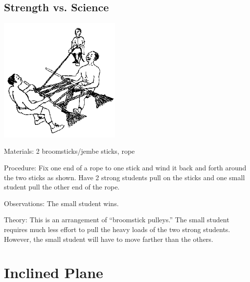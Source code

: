 \begin{multicols}{2}
\vfill
\columnbreak

\subsection{Strength vs. Science}

\begin{center}
\includegraphics[width=0.45\textwidth]{./img/source/pulley-strength.png}
\end{center}

\begin{description*}
\item[Materials:]{2 broomsticks/jembe sticks, rope}
\item[Procedure:]{Fix one end of a rope to one stick and wind it back and forth around the two sticks as shown. Have 2 strong students pull on the sticks and one small student pull the other end of the rope.}
\item[Observations:]{The small student wins.}
\item[Theory:]{This is an arrangement of ``broomstick pulleys.'' The small student requires much less effort to pull the heavy loads of the two strong students. However, the small student will have to move farther than the others.}
\end{description*}

\vfill
\columnbreak


\section*{Inclined Plane}



\end{multicols}
